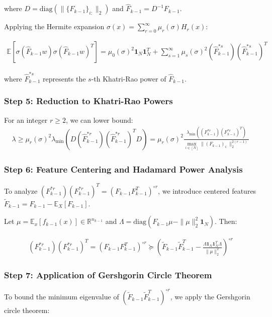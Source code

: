 \documentclass{article}
\newcommand{\E}{\mathbb{E}}
\newcommand{\R}{\mathbb{R}}
\newcommand{\evmin}[1]{\lambda_{\min}\left(#1\right)}
\begin{document}
where $D = \text{diag}(\|\{F_{k-1}\}_{i:}\|_2)$ and $\hat{F}_{k-1} = D^{-1}F_{k-1}$.

Applying the Hermite expansion $\sigma(x) = \sum_{r=0}^{\infty} \mu_r(\sigma) H_r(x)$:

\begin{align}
\E[\sigma(\hat{F}_{k-1}w)\sigma(\hat{F}_{k-1}w)^T] = \mu_0(\sigma)^2 \mathbf{1}_N \mathbf{1}_N^T + \sum_{s=1}^{\infty} \mu_s(\sigma)^2 (\hat{F}_{k-1}^{*s})(\hat{F}_{k-1}^{*s})^T
\end{align}

where $\hat{F}_{k-1}^{*s}$ represents the $s$-th Khatri-Rao power of $\hat{F}_{k-1}$.

\subsubsection{Step 5: Reduction to Khatri-Rao Powers}

For an integer $r \geq 2$, we can lower bound:
\begin{align}
\lambda \geq \mu_r(\sigma)^2 \evmin{D(\hat{F}_{k-1}^{*r})(\hat{F}_{k-1}^{*r})^T D} = \mu_r(\sigma)^2 \frac{\evmin{(F_{k-1}^{*r})(F_{k-1}^{*r})^T}}{\max_{i \in [N]} \|(F_{k-1})_{i:}\|_2^{2(r-1)}}
\end{align}

\subsubsection{Step 6: Feature Centering and Hadamard Power Analysis}

To analyze $(F_{k-1}^{*r})(F_{k-1}^{*r})^T = (F_{k-1}F_{k-1}^T)^{\circ r}$, we introduce centered features $\tilde{F}_{k-1} = F_{k-1} - \E_X[F_{k-1}]$. 

Let $\mu = \E_x[f_{k-1}(x)] \in \R^{n_{k-1}}$ and $\Lambda = \text{diag}(F_{k-1}\mu - \|\mu\|_2^2 \mathbf{1}_N)$. Then:

\begin{align}
(F_{k-1}^{*r})(F_{k-1}^{*r})^T = (F_{k-1}F_{k-1}^T)^{\circ r} \succeq \left(\tilde{F}_{k-1}\tilde{F}_{k-1}^T - \frac{\Lambda \mathbf{1}_N \mathbf{1}_N^T \Lambda}{\|\mu\|_2^2}\right)^{\circ r}
\end{align}

\subsubsection{Step 7: Application of Gershgorin Circle Theorem}

To bound the minimum eigenvalue of $(\tilde{F}_{k-1}\tilde{F}_{k-1}^T)^{\circ r}$, we apply the Gershgorin circle theorem:
\end{document}
